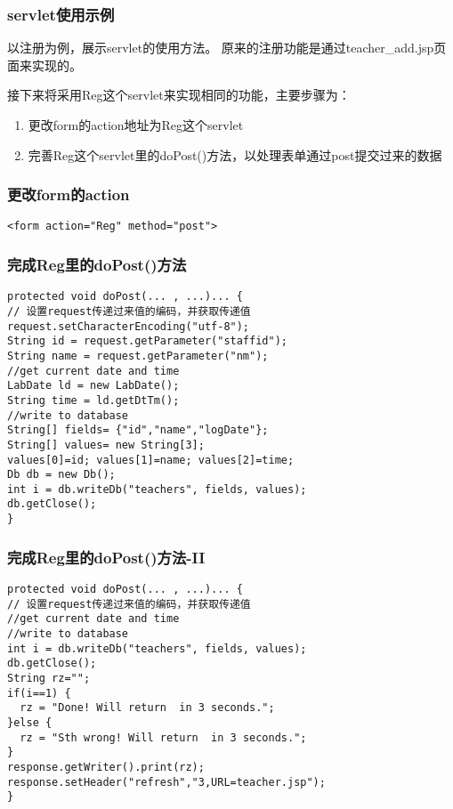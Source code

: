 \documentclass{beamer}
\begin{document}
\begin{frame}
\frametitle{servlet使用示例}
以注册为例，展示servlet的使用方法。
原来的注册功能是通过teacher\_add.jsp页面来实现的。

接下来将采用Reg这个servlet来实现相同的功能，主要步骤为：

\begin{enumerate}
\item
更改form的action地址为Reg这个servlet
\item
完善Reg这个servlet里的doPost()方法，以处理表单通过post提交过来的数据
\end{enumerate}
\end{frame}
\begin{frame}[fragile]
\frametitle{更改form的action}
\begin{lstlisting}
<form action="Reg" method="post">
\end{lstlisting}
\end{frame}
\begin{frame}[fragile]
\frametitle{完成Reg里的doPost()方法}
\begin{lstlisting}
protected void doPost(... , ...)... {
// 设置request传递过来值的编码，并获取传递值
request.setCharacterEncoding("utf-8");
String id = request.getParameter("staffid");
String name = request.getParameter("nm");
//get current date and time
LabDate ld = new LabDate();  
String time = ld.getDtTm();
//write to database
String[] fields= {"id","name","logDate"};
String[] values= new String[3];
values[0]=id; values[1]=name; values[2]=time;
Db db = new Db();
int i = db.writeDb("teachers", fields, values);
db.getClose();
}
\end{lstlisting}
\end{frame}
\begin{frame}[fragile]
\frametitle{完成Reg里的doPost()方法-II}
\begin{lstlisting}
protected void doPost(... , ...)... {
// 设置request传递过来值的编码，并获取传递值
//get current date and time
//write to database
int i = db.writeDb("teachers", fields, values);
db.getClose();
String rz="";
if(i==1) {
  rz = "Done! Will return  in 3 seconds.";
}else {
  rz = "Sth wrong! Will return  in 3 seconds.";
}
response.getWriter().print(rz);
response.setHeader("refresh","3,URL=teacher.jsp");
}
\end{lstlisting}
\end{frame}
\end{document}
